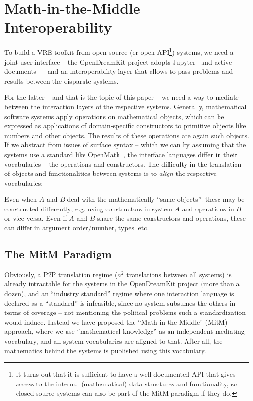 \section{Math-in-the-Middle Interoperability}\label{sec:mitm}

To build a VRE toolkit from open-source (or open-API\footnote{It turns out that it is
  sufficient to have a well-documented API that gives access to the internal
  (mathematical) data structures and functionality, so closed-source systems can also be
  part of the MitM paradigm if they do.}) systems, we need a joint user interface -- the
OpenDreamKit project adopts Jupyter~\cite{jupyter-project:on} and active
documents~\cite{KohDavGin:psewads11} -- and an interoperability layer that allows to pass
problems and results between the disparate systems. 

For the latter -- and that is the topic of this paper -- we need a way to mediate between
the interaction layers of the respective systems.  
Generally, mathematical software systems apply operations on mathematical objects, which
can be expressed as applications of domain-specific constructors to primitive objects like
numbers and other objects. The results of these operations are again such objects. If we
abstract from issues of surface syntax -- which we can by assuming that the systems use a
standard like OpenMath~\cite{BusCapCar:2oms04}, the interface languages differ in their
vocabularies -- the operations and constructors. The difficulty in the translation of
objects and functionalities between systems is to \emph{align} the respective
vocabularies:

Even when $A$ and $B$ deal with the mathematically ``same objects'',
these may be constructed differently; e.g. using constructors in
system $A$ and operations in $B$ or vice versa. Even if $A$ and $B$
share the same constructors and operations, these can differ in
argument order/number, types, etc.

\subsection{The MitM Paradigm}\label{sec:mitm:recap}

Obviously, a P2P translation regime ($n^2$ translations between all systems) is already
intractable for the systems in the OpenDreamKit project (more than a dozen), and an
``industry standard'' regime where one interaction language is declared as a ``standard''
is infeasible, since no system subsumes the others in terms of
coverage -- not mentioning the
political problems such a standardization would induce. Instead we have proposed the
``Math-in-the-Middle'' (MitM) approach, where we use ``mathematical knowledge'' as an
independent mediating vocabulary, and all system vocabularies are aligned to that. After
all, the mathematics behind the systems is published using this vocabulary.

